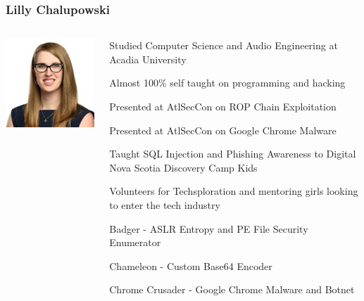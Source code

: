 \documentclass[aspectratio=169]{beamer}
\begin{document}
\begin{frame}
  \frametitle{Lilly Chalupowski}
  \begin{columns}
    \begin{column}{0.5\textwidth}
      \includegraphics[scale=0.5]{lilly_chalupowski}
    \end{column}
    \begin{column}{0.5\textwidth}
      \begin{center}
        \begin{tcolorbox}[title=\href{https://lillypad.github.io}{Biography},colback=gray]
          \begin{itemize}
            {\color{black} \tiny
            \item Studied Computer Science and Audio Engineering at Acadia University
            \item Almost 100\% self taught on programming and hacking
            \item Presented at AtlSecCon on ROP Chain Exploitation
            \item Presented at AtlSecCon on Google Chrome Malware
            \item Taught SQL Injection and Phishing Awareness to Digital Nova Scotia Discovery Camp Kids
            \item Volunteers for Techsploration and mentoring girls looking to enter the tech industry
            \item Badger - ASLR Entropy and PE File Security Enumerator
            \item Chameleon - Custom Base64 Encoder
            \item Chrome Crusader - Google Chrome Malware and Botnet
            }
          \end{itemize}
        \end{tcolorbox}
      \end{center}
    \end{column}
  \end{columns}
\end{frame}
\end{document}
